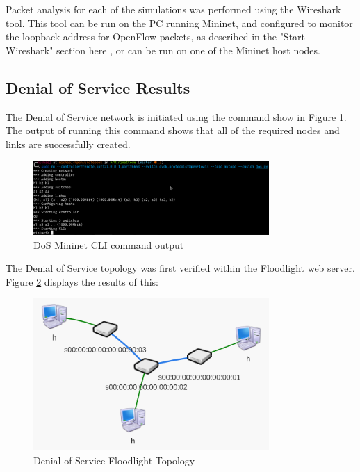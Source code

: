 Packet analysis for each of the simulations was performed using the Wireshark
tool. This tool can be run on the PC running Mininet, and configured to monitor
the loopback address for OpenFlow packets, as described in the "Start Wireshark"
section here \cite{mininetWS}, or can be run on one of the Mininet host nodes.

\subsection{Denial of Service Results}

The Denial of Service network is initiated using the command show in Figure
\ref{fig:images-dosMnCli}. The output of running this command shows that all of
the required nodes and links are successfully created.

\begin{figure}[H]
	\centering
	\includegraphics[width=0.8\textwidth]{images/dosMnCli}
	\caption{DoS Mininet CLI command output}
	\label{fig:images-dosMnCli}
\end{figure}

The Denial of Service topology was first verified within the Floodlight web
server. Figure \ref{fig:images-flDoS} displays the results of this:

\begin{figure}[H]
	\centering
	\includegraphics[width=0.8\textwidth]{images/flDoS}
	\caption{Denial of Service Floodlight Topology}
	\label{fig:images-flDoS}
\end{figure}

